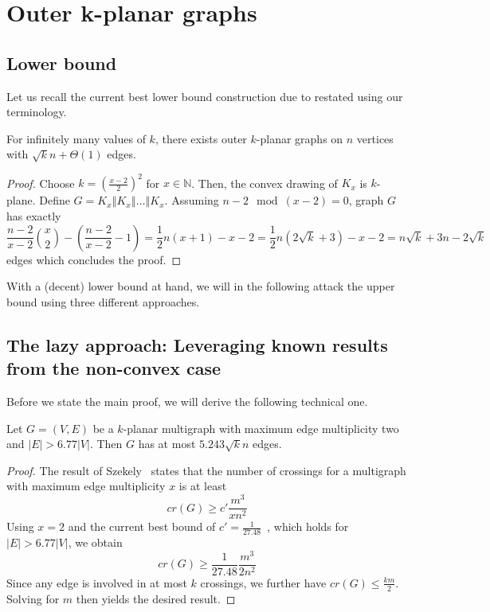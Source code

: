 \documentclass[nolineno,a4paper,USenglish,cleveref,autoref,thm-restate]
{socg}
\begin{document}
\section{Outer k-planar graphs}\label{sec:general}
\subsection{Lower bound}
Let us recall the current best lower bound construction due to \cite{ábrego2024bookcrossingnumberscomplete} restated using our terminology.
\begin{theorem}\label{thm:lower-general}
    For infinitely many values of $k$, there exists outer $k$-planar graphs on $n$ vertices with $\sqrt{k}n+\Theta(1)$ edges. 
\end{theorem}
\begin{proof}
Choose $k = (\frac{x-2}{2})^2$ for $x \in \mathbb{N}$. Then, the convex drawing of $K_x$ is $k$-plane.
Define $G = K_x \mathbin\Vert K_x \mathbin\Vert \dots \mathbin\Vert K_x$.
Assuming $n-2 \mod (x-2) = 0$, graph $G$ has exactly
\[\frac{n-2}{x-2} \binom{x}{2} - (\frac{n-2}{x-2}-1) =\frac{1}{2}n(x + 1) - x - 2 = \frac{1}{2}n(2\sqrt{k}+3) - x - 2 = n\sqrt{k}+3n-2\sqrt{k} \]
edges which concludes the proof.
\end{proof}
With a (decent) lower bound at hand, we will in the following attack the upper bound using three different approaches.
\subsection{The lazy approach: Leveraging known results from the non-convex case} \label{sec:crossing-lemma}
Before we state the main proof, we will derive the following technical one.
\begin{lemma}\label{lem:edge-density-mult-two}
Let $G=(V,E)$ be a $k$-planar multigraph with maximum edge multiplicity two and $|E| > 6.77|V|$. Then $G$ has at most $5.243\sqrt{k}n$ edges.
\end{lemma}
\begin{proof}
    The result of Szekely~\cite{DBLP:journals/cpc/Szekely97} states that the number of crossings for a multigraph with maximum edge multiplicity $x$ is at least 
    \[cr(G) \geq c'\frac{m^3}{xn^2} \]
    Using $x = 2$ and the current best bound of $c' = \frac{1}{27.48}$~\cite{BestConstantCL}, which holds for $|E| > 6.77|V|$, we obtain
    \[cr(G) \geq \frac{1}{27.48}\frac{m^3}{2n^2} \]
    Since any edge is involved in at most $k$ crossings, we further have $cr(G) \leq \frac{km}{2}$.
    Solving for $m$ then yields the desired result.
\end{proof}
\end{document}
